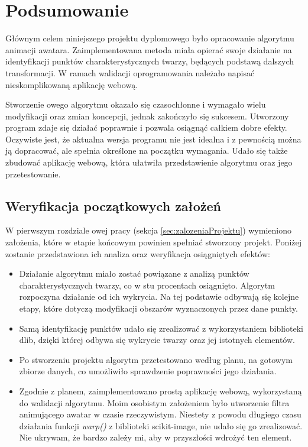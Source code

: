 \chapter{Podsumowanie}
\label{cha:podsumowanie}
Głównym celem niniejszego projektu dyplomowego było opracowanie algorytmu animacji awatara. Zaimplementowana metoda miała opierać swoje działanie na identyfikacji punktów charakterystycznych twarzy, będących podstawą dalszych transformacji. W ramach walidacji oprogramowania należało napisać nieskomplikowaną aplikację webową.

Stworzenie owego algorytmu okazało się czasochłonne i wymagało wielu modyfikacji oraz zmian koncepcji, jednak zakończyło się sukcesem.  Utworzony program zdaje się działać poprawnie i pozwala osiągnąć całkiem dobre efekty. Oczywiste jest, że aktualna wersja programu nie jest idealna i z pewnością można ją dopracować, ale spełnia określone na początku wymagania. Udało się także zbudować aplikację webową, która ułatwiła przedstawienie algorytmu oraz jego przetestowanie. 


\section{Weryfikacja początkowych założeń}
W pierwszym rozdziale owej pracy (sekcja \ref{sec:zalozeniaProjektu}) wymieniono założenia, które w etapie końcowym powinien spełniać stworzony projekt. Poniżej zostanie przedstawiona ich analiza oraz weryfikacja osiągniętych efektów:

\begin{itemize}
    \item Działanie algorytmu miało zostać powiązane z analizą punktów charakterystycznych twarzy, co w stu procentach osiągnięto. Algorytm rozpoczyna działanie od ich wykrycia. Na tej podstawie odbywają się kolejne etapy, które dotyczą modyfikacji obszarów wyznaczonych przez dane punkty.
    \item Samą identyfikację punktów udało się zrealizować z wykorzystaniem biblioteki dlib, dzięki której odbywa się wykrycie twarzy oraz jej istotnych elementów. 
    \item Po stworzeniu projektu algorytm przetestowano według planu, na gotowym zbiorze danych, co umożliwiło sprawdzenie poprawności jego działania.
    \item Zgodnie z planem, zaimplementowano prostą aplikację webową, wykorzystaną do walidacji algorytmu. Moim osobistym założeniem było utworzenie filtra animującego awatar w czasie rzeczywistym. Niestety z powodu długiego czasu działania funkcji \textit{warp()} z biblioteki scikit-image, nie udało się go zrealizować. Nie ukrywam, że bardzo zależy mi, aby w przyszłości wdrożyć ten element.
\end{itemize}

